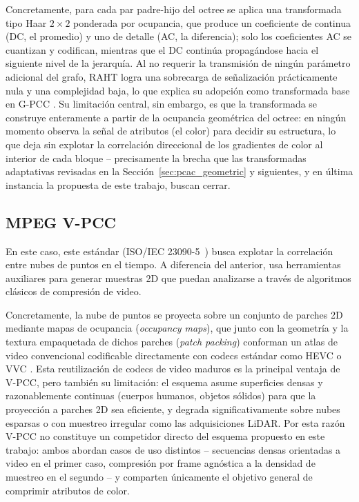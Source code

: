 	Concretamente, para cada par padre-hijo del octree se aplica una transformada tipo Haar $2\times 2$ ponderada por ocupancia, que produce un coeficiente de continua (DC, el promedio) y uno de detalle (AC, la diferencia); solo los coeficientes AC se cuantizan y codifican, mientras que el DC continúa propagándose hacia el siguiente nivel de la jerarquía. Al no requerir la transmisión de ningún parámetro adicional del grafo, RAHT logra una sobrecarga de señalización prácticamente nula y una complejidad baja, lo que explica su adopción como transformada base en G-PCC \cite{dequeiroz2016raht}. Su limitación central, sin embargo, es que la transformada se construye enteramente a partir de la ocupancia geométrica del octree: en ningún momento observa la señal de atributos (el color) para decidir su estructura, lo que deja sin explotar la correlación direccional de los gradientes de color al interior de cada bloque -- precisamente la brecha que las transformadas adaptativas revisadas en la Sección~\ref{sec:pcac_geometric} y siguientes, y en última instancia la propuesta de este trabajo, buscan cerrar.


    \subsection{MPEG V-PCC}
        En este caso, este estándar (ISO/IEC 23090-5~\cite{iso2023vpcc}) busca explotar la correlación entre nubes de puntos
        en el tiempo. A diferencia del anterior, usa herramientas auxiliares para generar
        muestras 2D que puedan analizarse a través de algoritmos clásicos de compresión
        de video.

        Concretamente, la nube de puntos se proyecta sobre un conjunto de parches 2D
        mediante mapas de ocupancia (\textit{occupancy maps}), que junto con la geometría
        y la textura empaquetada de dichos parches (\textit{patch packing}) conforman un
        atlas de video convencional codificable directamente con codecs estándar como HEVC
        o VVC \cite{graziosi2020overview}. Esta reutilización de codecs de video maduros es
        la principal ventaja de V-PCC, pero también su limitación: el esquema asume
        superficies densas y razonablemente continuas (cuerpos humanos, objetos sólidos)
        para que la proyección a parches 2D sea eficiente, y degrada significativamente
        sobre nubes esparsas o con muestreo irregular como las adquisiciones LiDAR. Por
        esta razón V-PCC no constituye un competidor directo del esquema propuesto en este
        trabajo: ambos abordan casos de uso distintos -- secuencias densas orientadas a
        video en el primer caso, compresión por frame agnóstica a la densidad de muestreo
        en el segundo -- y comparten únicamente el objetivo general de comprimir atributos
        de color.

